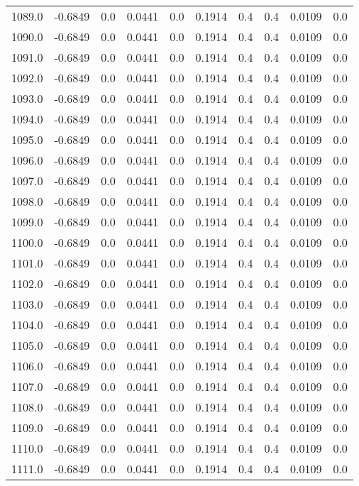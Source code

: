 \begin{longtable}{lrrrrrrrrr}
1089.0 & -0.6849 & 0.0 & 0.0441 & 0.0 & 0.1914 & 0.4 & 0.4 & 0.0109 & 0.0 \\
1090.0 & -0.6849 & 0.0 & 0.0441 & 0.0 & 0.1914 & 0.4 & 0.4 & 0.0109 & 0.0 \\
1091.0 & -0.6849 & 0.0 & 0.0441 & 0.0 & 0.1914 & 0.4 & 0.4 & 0.0109 & 0.0 \\
1092.0 & -0.6849 & 0.0 & 0.0441 & 0.0 & 0.1914 & 0.4 & 0.4 & 0.0109 & 0.0 \\
1093.0 & -0.6849 & 0.0 & 0.0441 & 0.0 & 0.1914 & 0.4 & 0.4 & 0.0109 & 0.0 \\
1094.0 & -0.6849 & 0.0 & 0.0441 & 0.0 & 0.1914 & 0.4 & 0.4 & 0.0109 & 0.0 \\
1095.0 & -0.6849 & 0.0 & 0.0441 & 0.0 & 0.1914 & 0.4 & 0.4 & 0.0109 & 0.0 \\
1096.0 & -0.6849 & 0.0 & 0.0441 & 0.0 & 0.1914 & 0.4 & 0.4 & 0.0109 & 0.0 \\
1097.0 & -0.6849 & 0.0 & 0.0441 & 0.0 & 0.1914 & 0.4 & 0.4 & 0.0109 & 0.0 \\
1098.0 & -0.6849 & 0.0 & 0.0441 & 0.0 & 0.1914 & 0.4 & 0.4 & 0.0109 & 0.0 \\
1099.0 & -0.6849 & 0.0 & 0.0441 & 0.0 & 0.1914 & 0.4 & 0.4 & 0.0109 & 0.0 \\
1100.0 & -0.6849 & 0.0 & 0.0441 & 0.0 & 0.1914 & 0.4 & 0.4 & 0.0109 & 0.0 \\
1101.0 & -0.6849 & 0.0 & 0.0441 & 0.0 & 0.1914 & 0.4 & 0.4 & 0.0109 & 0.0 \\
1102.0 & -0.6849 & 0.0 & 0.0441 & 0.0 & 0.1914 & 0.4 & 0.4 & 0.0109 & 0.0 \\
1103.0 & -0.6849 & 0.0 & 0.0441 & 0.0 & 0.1914 & 0.4 & 0.4 & 0.0109 & 0.0 \\
1104.0 & -0.6849 & 0.0 & 0.0441 & 0.0 & 0.1914 & 0.4 & 0.4 & 0.0109 & 0.0 \\
1105.0 & -0.6849 & 0.0 & 0.0441 & 0.0 & 0.1914 & 0.4 & 0.4 & 0.0109 & 0.0 \\
1106.0 & -0.6849 & 0.0 & 0.0441 & 0.0 & 0.1914 & 0.4 & 0.4 & 0.0109 & 0.0 \\
1107.0 & -0.6849 & 0.0 & 0.0441 & 0.0 & 0.1914 & 0.4 & 0.4 & 0.0109 & 0.0 \\
1108.0 & -0.6849 & 0.0 & 0.0441 & 0.0 & 0.1914 & 0.4 & 0.4 & 0.0109 & 0.0 \\
1109.0 & -0.6849 & 0.0 & 0.0441 & 0.0 & 0.1914 & 0.4 & 0.4 & 0.0109 & 0.0 \\
1110.0 & -0.6849 & 0.0 & 0.0441 & 0.0 & 0.1914 & 0.4 & 0.4 & 0.0109 & 0.0 \\
1111.0 & -0.6849 & 0.0 & 0.0441 & 0.0 & 0.1914 & 0.4 & 0.4 & 0.0109 & 0.0 \\

\end{longtable}

